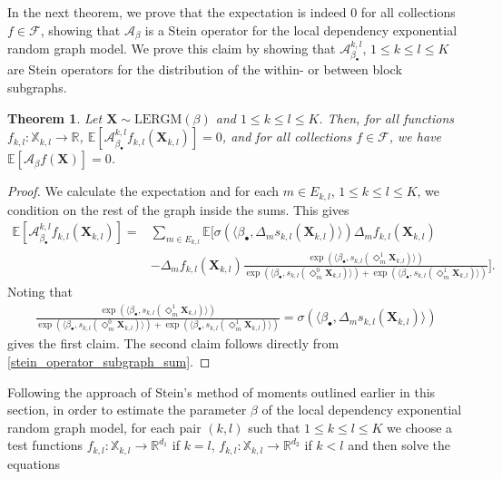 \documentclass{article}
\newtheorem{Theorem}{Theorem}[section]
\begin{document}
In the next theorem, we prove that the expectation is indeed $0$ for all collections $f \in \mathcal{F}$, showing that $\mathcal{A}_{\beta}$ is a Stein operator for the local dependency exponential random graph model. We prove this claim by showing that  $\mathcal{A}_{\beta_{\bullet}}^{k,l}$, $1 \leq k \leq l \leq K$ are Stein operators for the distribution of the within- or between block subgraphs.
\begin{Theorem} \label{theorem_stein_identity}
    Let $\mathbf{X} \sim \mathrm{LERGM}(\beta)$ and $1 \leq k \leq l \leq K$. Then,   for all functions $f_{k,l}: \mathbb{X}_{k,l} \rightarrow \mathbb{R}$, $\mathbb{E}[\mathcal{A}_{\beta_{\bullet}}^{k,l} f_{k,l}(\mathbf{X}_{k,l})]=0 $,  and for all collections $f \in \mathcal{F}$, we have $  \mathbb{E}[\mathcal{A}_{\beta}f(\mathbf{X})]=0$.
\end{Theorem}
\begin{proof}
We calculate the expectation and for each $m \in E_{k,l}$, $1\leq k \leq l \leq K$, we condition on the rest of the graph inside the sums. This gives
\begin{align*}
    \mathbb{E}[\mathcal{A}_{\beta_{\bullet}}^{k,l} f_{k,l}(\mathbf{X}_{k,l})]= & 
     \sum_{m\in E_{k,l}} \mathbb{E}\bigg[ \sigma ( \langle \beta_{\bullet} , \Delta_m s_{k,l}(\mathbf{X}_{k,l}) \rangle )  \Delta_m f_{k,l}(\mathbf{X}_{k,l}) \\
    &  - \Delta_m f_{k,l}(\mathbf{X}_{k,l}) \frac{\exp(\langle \beta_{\bullet} , s_{k,l}(\Diamond_{m}^{1}\mathbf{X}_{k,l}) \rangle)}{\exp(\langle \beta_{\bullet} , s_{k,l}(\Diamond_{m}^{0}\mathbf{X}_{k,l}) \rangle)+\exp(\langle \beta_{\bullet} , s_{k,l}(\Diamond_{m}^{1}\mathbf{X}_{k,l}) \rangle)} \bigg].
\end{align*}
Noting that
\begin{align*}
    \frac{\exp(\langle \beta_{\bullet} , s_{k,l}(\Diamond_{m}^{1}\mathbf{X}_{k,l}) \rangle)}{\exp(\langle \beta_{\bullet} , s_{k,l}(\Diamond_{m}^{0}\mathbf{X}_{k,l}) \rangle)+\exp(\langle \beta_{\bullet} , s_{k,l}(\Diamond_{m}^{1}\mathbf{X}_{k,l}) \rangle)} =  \sigma ( \langle \beta_{\bullet} , \Delta_m s_{k,l}(\mathbf{X}_{k,l}) \rangle )
\end{align*}
gives the first claim. The second claim follows directly from \eqref{stein_operator_subgraph_sum}.
\end{proof}
Following the approach of Stein's method of moments outlined earlier in this section, in order to estimate the parameter $\beta$ of the local dependency exponential random graph model, for each pair $(k,l)$ such that $1 \leq k \leq l \leq K$ we choose a test functions $f_{k,l}: \mathbb{X}_{k,l} \rightarrow \mathbb{R}^{d_1}$ if $k=l$, $f_{k,l}: \mathbb{X}_{k,l} \rightarrow \mathbb{R}^{d_2}$ if $k<l$ and then solve the equations
\end{document}
